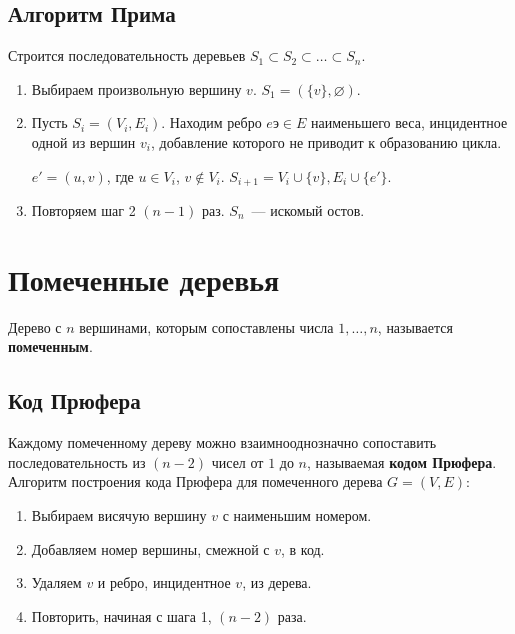 \subsection{Алгоритм Прима}
	Строится последовательность деревьев $S_1 \subset S_2 \subset \ldots \subset S_n$.
\begin{enumerate}
	\item Выбираем произвольную вершину $v$. $S_1 = (\{ v \}, \varnothing)$.
	\item Пусть $S_i = (V_i, E_i)$. Находим ребро $eэ \in E$ наименьшего веса, инцидентное одной из вершин $v_i$, добавление которого не приводит к образованию цикла.
	
	$e' = (u, v)$, где $u \in V_i$, $v \notin V_i$. $S_{i+1} = {V_i \cup \{ v \}, E_i \cup \{ e' \}}$.
	\item Повторяем шаг 2 $(n - 1)$ раз. $S_n$~--- искомый остов.
\end{enumerate}

\section{Помеченные деревья}
\begin{definition}
	Дерево с $n$ вершинами, которым сопоставлены числа $1, \ldots, n$, называется \textbf{помеченным}.
\end{definition}

\subsection{Код Прюфера}
	Каждому помеченному дереву можно взаимнооднозначно сопоставить последовательность из $(n - 2)$ чисел от $1$ до $n$, называемая \textbf{кодом Прюфера}. Алгоритм построения кода Прюфера для помеченного дерева $G = (V, E)$:
\begin{enumerate}
	\item Выбираем висячую вершину $v$ с наименьшим номером.
	\item Добавляем номер вершины, смежной с $v$, в код.
	\item Удаляем $v$ и ребро, инцидентное $v$, из дерева.
	\item Повторить, начиная с шага 1, $(n - 2)$ раза.
\end{enumerate}


